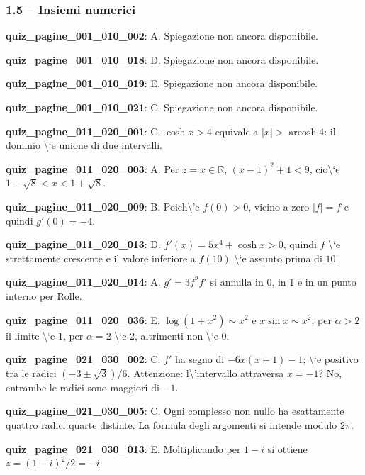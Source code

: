 \documentclass[11pt,a4paper]{article}
\newcounter{quiz}
\begin{document}
\subsubsection*{1.5 -- Insiemi numerici}
\noindent\textbf{quiz\_pagine\_001\_010\_002}: A. Spiegazione non ancora disponibile.\par\medskip
\noindent\textbf{quiz\_pagine\_001\_010\_018}: D. Spiegazione non ancora disponibile.\par\medskip
\noindent\textbf{quiz\_pagine\_001\_010\_019}: E. Spiegazione non ancora disponibile.\par\medskip
\noindent\textbf{quiz\_pagine\_001\_010\_021}: C. Spiegazione non ancora disponibile.\par\medskip
\noindent\textbf{quiz\_pagine\_011\_020\_001}: C. $\cosh x>4$ equivale a $|x|>\operatorname{arcosh}4$: il dominio \textbackslash{}`e unione di due intervalli.\par\medskip
\noindent\textbf{quiz\_pagine\_011\_020\_003}: A. Per $z=x\in\mathbb R$, $(x-1)^2+1<9$, cio\textbackslash{}`e $1-\sqrt8<x<1+\sqrt8$.\par\medskip
\noindent\textbf{quiz\_pagine\_011\_020\_009}: B. Poich\textbackslash{}'e $f(0)>0$, vicino a zero $|f|=f$ e quindi $g\prime(0)=-4$.\par\medskip
\noindent\textbf{quiz\_pagine\_011\_020\_013}: D. $f\prime(x)=5x^4+\cosh x>0$, quindi $f$ \textbackslash{}`e strettamente crescente e il valore inferiore a $f(10)$ \textbackslash{}`e assunto prima di $10$.\par\medskip
\noindent\textbf{quiz\_pagine\_011\_020\_014}: A. $g\prime=3f^2f\prime$ si annulla in $0$, in $1$ e in un punto interno per Rolle.\par\medskip
\noindent\textbf{quiz\_pagine\_011\_020\_036}: E. $\log(1+x^2)\sim x^2$ e $x\sin x\sim x^2$; per $\alpha>2$ il limite \textbackslash{}`e $1$, per $\alpha=2$ \textbackslash{}`e $2$, altrimenti non \textbackslash{}`e $0$.\par\medskip
\noindent\textbf{quiz\_pagine\_021\_030\_002}: C. $f\prime$ ha segno di $-6x(x+1)-1$; \textbackslash{}`e positivo tra le radici $(-3\pm\sqrt3)/6$. Attenzione: l\textbackslash{}'intervallo attraversa $x=-1$? No, entrambe le radici sono maggiori di $-1$.\par\medskip
\noindent\textbf{quiz\_pagine\_021\_030\_005}: C. Ogni complesso non nullo ha esattamente quattro radici quarte distinte. La formula degli argomenti si intende modulo $2\pi$.\par\medskip
\noindent\textbf{quiz\_pagine\_021\_030\_013}: E. Moltiplicando per $1-i$ si ottiene $z=(1-i)^2/2=-i$.\par\medskip
\end{document}
